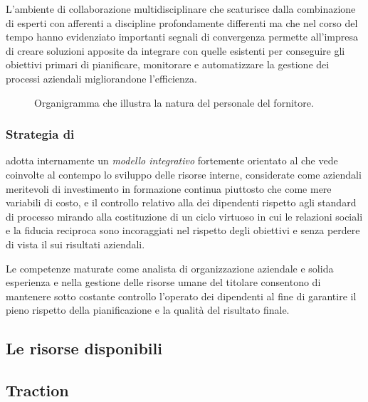 L'ambiente di collaborazione multidisciplinare che scaturisce dalla combinazione di esperti con  afferenti a discipline profondamente differenti ma che nel corso del tempo hanno evidenziato importanti segnali di convergenza permette all'impresa di creare soluzioni apposite da integrare con quelle esistenti per conseguire gli obiettivi primari di pianificare, monitorare e automatizzare la gestione dei processi aziendali migliorandone l'efficienza.

\begin{figure}[h]
\centering

\caption{Organigramma che illustra la natura del personale del fornitore.}
\label{fig:organigram}
\end{figure}

\subsubsection{Strategia di }
\team adotta internamente un \emph{modello integrativo} fortemente orientato al  che vede coinvolte al contempo lo sviluppo delle risorse interne, considerate come  aziendali meritevoli di investimento in formazione continua piuttosto che come mere variabili di costo, e il controllo relativo alla  dei dipendenti rispetto agli standard di processo mirando alla costituzione di un ciclo virtuoso in cui le relazioni sociali e la fiducia reciproca sono incoraggiati nel rispetto degli obiettivi e senza perdere di vista il  sui risultati aziendali.

Le competenze maturate come analista di organizzazione aziendale e solida esperienza e nella gestione delle risorse umane del titolare consentono di mantenere sotto costante controllo l'operato dei dipendenti al fine di garantire il pieno rispetto della pianificazione e la qualità del risultato finale.

\subsection{Le risorse disponibili}

\subsection{Traction}
